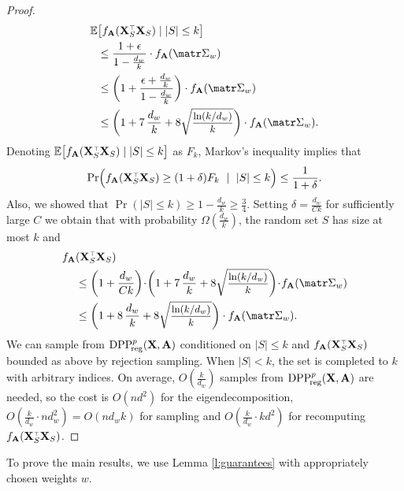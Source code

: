 \documentclass[../../thesis.tex]{subfiles}
\begin{document}
\begin{proof}
  \begin{align*}
    \E & \big[f_{\A}(\X_S^\top\X_S)\mid |S|\leq k\big]                \\
       & \leq \frac{1+\epsilon}{1-\frac{d_w}k}\cdot f_{\A}(\Sigmab_w) \\
       & \leq
    \bigg(1+\frac{\epsilon+\frac{d_w}k}{1-\frac{d_w}k}\bigg)\cdot
    f_{\A}(\Sigmab_w)
    \\ &\leq \bigg(1+7\,\frac{d_w}{k} +
    8\sqrtshort{\frac{\ln(k/d_w)}{k}}\bigg)\cdot f_{\A}(\Sigmab_w).
  \end{align*}
  Denoting $\E\big[f_{\A}(\X_S^\top\X_S)\mid |S|\leq k\big]$ as $F_k$,
  Markov's inequality implies that
  \[\Pr\Big(f_{\A}(\X_S^\top\X_S) \geq
    (1+\delta) F_k\ \mid\ |S|\leq k\Big)\leq \frac1{1+\delta}.\]
  Also, we showed
  that $\Pr(|S|\leq k)\geq 1-\frac{d_w}{k}\geq \frac34$. Setting $\delta=\frac{d_w}{C
      k}$ for sufficiently large $C$ we obtain that with probability
  $\Omega(\frac{d_w}{k})$, the random set $S$ has size at most $k$ and
  \begin{align*}
    f_{\A} & (\X_S^\top\X_S)                                                        \\
           & \leq \bigg(1+\frac{d_w}{C k}\bigg)\!\cdot\! \bigg(1+7\,\frac{d_w}{k} +
    8\sqrtshort{\frac{\ln(k/d_w)}{k}}\bigg)\!\cdot\! f_{\A}(\Sigmab_w)              \\
           & \leq
    \bigg(1+8\,\frac{d_w}{k} +
    8\sqrtshort{\frac{\ln(k/d_w)}{k}}\bigg)\cdot f_{\A}(\Sigmab_w).
  \end{align*}
  We can sample from ${{\mathrm{DPP}}_{\!\mathrm{reg}}^{p}}(\mathbf X,\mathbf A)$ conditioned on
  $|S|\leq k$ and $f_{\A}(\X_S^\top\X_S)$ bounded as above by rejection
  sampling. When $|S|<k$,  the set is completed to
  $k$ with arbitrary indices. On average, $O(\frac k{d_w})$ samples from
  ${{\mathrm{DPP}}_{\!\mathrm{reg}}^{p}}(\mathbf X,\mathbf A)$ are needed, so the cost is $O(nd^2)$ for the
  eigendecomposition, $O(\frac{k}{d_w}\cdot nd_w^2)=O(nd_wk)$ for
  sampling and $O(\frac k{d_w}\cdot kd^2)$ for recomputing $f_{\A}(\X_S^\top\X_S)$.
\end{proof}
To prove the main results, we use Lemma \ref{l:guarantees} with
appropriately chosen weights $w$.
\end{document}
